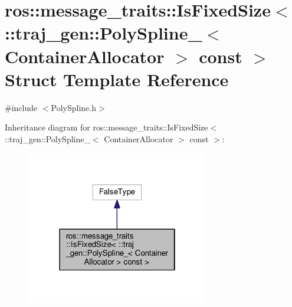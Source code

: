 \hypertarget{structros_1_1message__traits_1_1_is_fixed_size_3_01_1_1traj__gen_1_1_poly_spline___3_01_containe7fdff08ae232c9034e9184a70d2080ac}{}\section{ros\+:\+:message\+\_\+traits\+:\+:Is\+Fixed\+Size$<$ \+:\+:traj\+\_\+gen\+:\+:Poly\+Spline\+\_\+$<$ Container\+Allocator $>$ const $>$ Struct Template Reference}
\label{structros_1_1message__traits_1_1_is_fixed_size_3_01_1_1traj__gen_1_1_poly_spline___3_01_containe7fdff08ae232c9034e9184a70d2080ac}


{\ttfamily \#include $<$Poly\+Spline.\+h$>$}



Inheritance diagram for ros\+:\+:message\+\_\+traits\+:\+:Is\+Fixed\+Size$<$ \+:\+:traj\+\_\+gen\+:\+:Poly\+Spline\+\_\+$<$ Container\+Allocator $>$ const $>$\+:
\nopagebreak
\begin{figure}[H]
\begin{center}
\leavevmode
\includegraphics[width=226pt]{structros_1_1message__traits_1_1_is_fixed_size_3_01_1_1traj__gen_1_1_poly_spline___3_01_containe2ffa21fbf829e05347b72d9fb9c3a074}
\end{center}
\end{figure}


